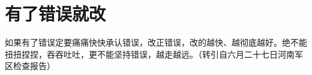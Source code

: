 \section[有了错误就改（一九六七年六月）]{有了错误就改}


如果有了错误定要痛痛快快承认错误，改正错误，改的越快、越彻底越好。绝不能扭扭捏捏，吞吞吐吐，更不能坚持错误，越走越远。（转引自六月二十七日河南军区检查报告）

